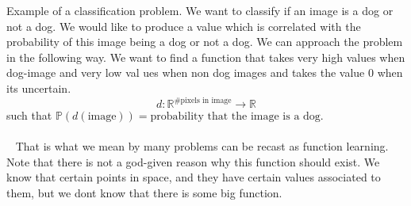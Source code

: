 \documentclass[../main.tex]{subfiles}
\begin{document}
\begin{xmpl} Example of a classification problem. We want to classify if an image is a dog or not a dog. We would like to produce a value which is correlated with the probability of this image being a dog or not a dog.  We can approach the problem in the following way. We want to find a function that takes very high values when dog-image and very low val ues when non dog images and takes the value 0 when its uncertain. 
	$$d: \mathbb{R}^{\# \text{pixels in image}} \rightarrow \mathbb{R} $$
	such that $\mathbb{P}(d(\text{image})) = \text{probability that the image is a dog.}$ \\ \\  
	That is what we mean by many problems can be recast as function learning. Note that there is not a god-given reason why this function should exist. We know that certain points in space, and they have certain values associated to them, but we dont know that there is some big function. 
\end{xmpl}
	
\end{document}
